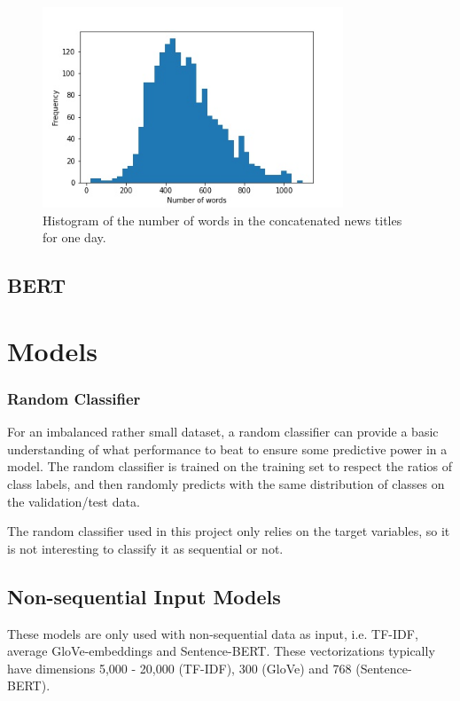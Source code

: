 \begin{figure}[h]
\centering
\includegraphics[width=0.8\textwidth]{Figures/wordcount.jpg}
\caption{Histogram of the number of words in the concatenated news titles for one day. }
\end{figure}

\subsection{BERT}





\section{Models}

\subsubsection*{Random Classifier}

For an imbalanced rather small dataset, a random classifier can provide a basic understanding of what performance to beat to ensure some predictive power in a model. The random classifier is trained on the training set to respect the ratios of class labels, and then randomly predicts with the same distribution of classes on the validation/test data. 

The random classifier used in this project only relies on the target variables, so it is not interesting to classify it as sequential or not.  

\subsection{Non-sequential Input Models}

These models are only used with non-sequential data as input, i.e. TF-IDF, average GloVe-embeddings and Sentence-BERT. These vectorizations typically have dimensions 5,000 - 20,000 (TF-IDF), 300 (GloVe) and 768 (Sentence-BERT). 


